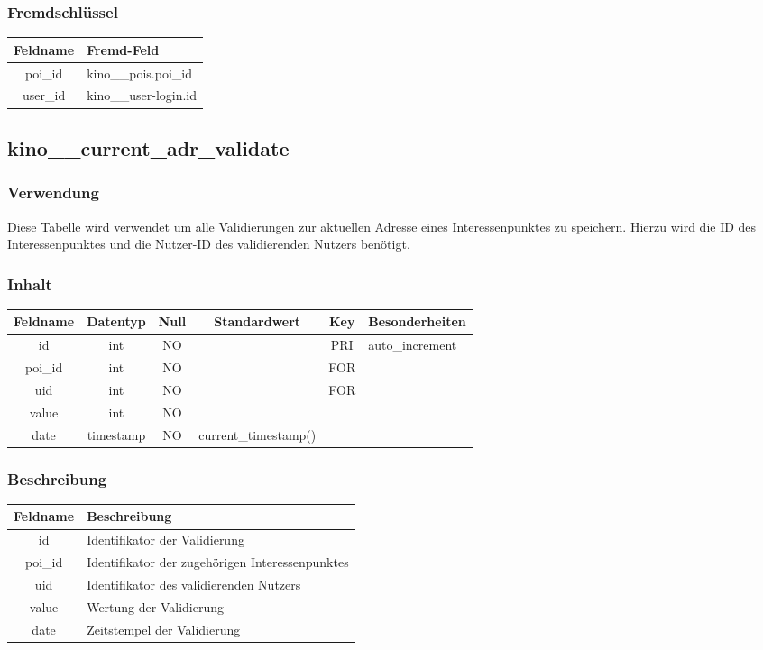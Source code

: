 \subsubsection{Fremdschlüssel}
\begin{table}[H]
	\begin{tabular}{|c|p{12.5cm}|}
		\hline
		\textbf{Feldname} & \textbf{Fremd-Feld} \\ \hline
		poi\_id & kino\_\_pois.poi\_id \\ \hline
		user\_id & kino\_\_user-login.id \\ \hline
	\end{tabular}
\end{table}
\subsection{kino\_\_current\_adr\_validate}
\subsubsection{Verwendung} Diese Tabelle wird verwendet um alle Validierungen zur aktuellen Adresse eines Interessenpunktes zu speichern. Hierzu wird die ID des Interessenpunktes und die Nutzer-ID des validierenden Nutzers benötigt.
\subsubsection{Inhalt}
\begin{table}[H]
	\begin{tabular}{|c|c|c|c|c|p{3.5cm}|}
		\hline
		\textbf{Feldname} & \textbf{Datentyp} & \textbf{Null} & \textbf{Standardwert} & \textbf{Key}   & \textbf{Besonderheiten} \\ \hline
		id & int & NO &  & PRI & auto\_increment \\ \hline
		poi\_id & int & NO &  & FOR & \\ \hline
		uid & int & NO &  & FOR & \\ \hline
		value & int & NO &  &  & \\ \hline
		date & timestamp & NO & current\_timestamp() &  & \\ \hline
	\end{tabular}
\end{table}
\subsubsection{Beschreibung}
\begin{table}[H]
	\begin{tabular}{|c|p{12cm}|}
		\hline
		\textbf{Feldname} & \textbf{Beschreibung} \\ \hline
		id & Identifikator der Validierung \\ \hline
		poi\_id & Identifikator der zugehörigen Interessenpunktes \\ \hline
		uid & Identifikator des validierenden Nutzers \\ \hline
		value & Wertung der Validierung \\ \hline
		date & Zeitstempel der Validierung \\ \hline
	\end{tabular}
\end{table}
